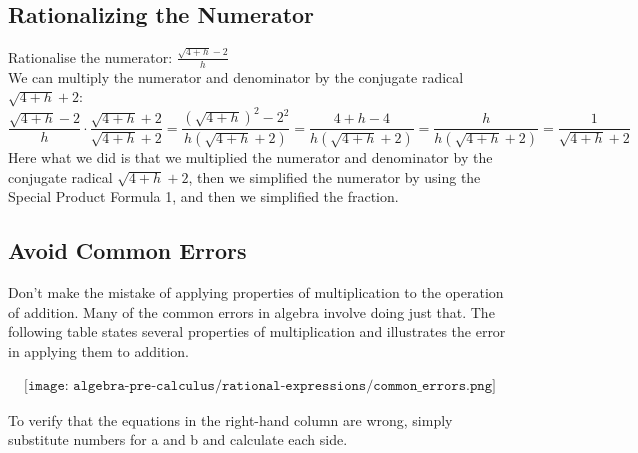\subsection{Rationalizing the Numerator}

Rationalise the numerator: $\displaystyle \frac{\sqrt{4+h}-2}{h}$ \\ \break
We can multiply the numerator and denominator by the conjugate radical $\sqrt{4+h}+2$:
$$ \frac{\sqrt{4+h}-2}{h} \cdot \frac{\sqrt{4+h}+2}{\sqrt{4+h}+2} = \frac{(\sqrt{4+h})^2-2^2}{h(\sqrt{4+h}+2)} = \frac{4+h-4}{h(\sqrt{4+h}+2)} = \frac{h}{h(\sqrt{4+h}+2)} = \frac{1}{\sqrt{4+h}+2}$$
Here what we did is that we multiplied the numerator and denominator by the conjugate radical $\sqrt{4+h}+2$, then we simplified the numerator by using the Special Product Formula 1, and then we simplified the fraction.


\subsection{Avoid Common Errors}
Don’t make the mistake of applying properties of multiplication to the operation of addition.
Many of the common errors in algebra involve doing just that. The following table states
several properties of multiplication and illustrates the error in applying them to addition.

\begin{align*}
    \texttt{[image: algebra-pre-calculus/rational-expressions/common\_errors.png]}
\end{align*}

To verify that the equations in the right-hand column are wrong, simply substitute
numbers for a and b and calculate each side.